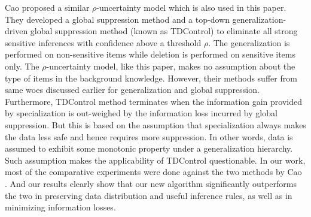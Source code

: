 

Cao \etal \cite{Cao:2010:rho} proposed a similar $\rho$-uncertainty model 
which is also used in this paper. 
They developed a global suppression method and a top-down
generalization-driven global suppression method (known as TDControl) 
to eliminate all strong sensitive inferences with confidence above 
a threshold $\rho$.
The generalization is performed on non-sensitive items
while deletion is performed on sensitive items only. The $\rho$-uncertainty
model, like this paper, makes no assumption about the type of items in
the background knowledge. However, their
methods suffer from same woes discussed earlier for generalization and
global suppression.
Furthermore, TDControl method terminates when
the information gain provided by specialization is out-weighed by
the information loss incurred by global suppression. But this is
based on the assumption that specialization always makes the data
less safe and hence requires more suppression. 
In other words, data is assumed to exhibit some 
monotonic property under a generalization hierarchy. 
Such assumption makes the applicability of TDControl questionable. 
In our work, most of the comparative experiments
were done against the two methods by Cao \etal. And our results clearly
show that our new algorithm significantly outperforms the two in
preserving data distribution and useful inference rules, as well as in
minimizing information losses.

